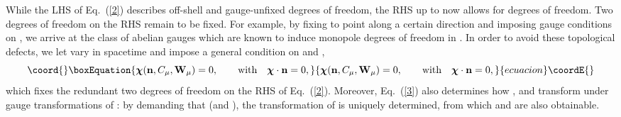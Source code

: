 \documentclass[a4paper,12pt]{article}
\providecommand{\re}[1]{~(\ref{#1})}\usepackage{useful_macros}
\begin{document}
While the LHS of Eq.\re{2} describes \coordHE{} off-shell and gauge-unfixed degrees of freedom,
the RHS up to now allows for \coordHE{} degrees of freedom. Two
degrees of freedom on the RHS remain to be fixed. For example, by
fixing \myHighlight{$\mn$}\coordHE{} to point along a certain direction and imposing gauge
conditions on \myHighlight{$\mW_\mu$}\coordHE{}, we arrive at the class of abelian gauges
which are known to induce monopole degrees of freedom in \coordHE{}. In
order to avoid these topological defects, we let \myHighlight{$\mn$}\coordHE{} vary in
spacetime and impose a general condition on \coordHE{} and \myHighlight{$\mW_\mu$}\coordHE{},
\begin{equation}\coord{}\boxEquation{
\mX(\mn,C_\mu,\mW_\mu)=0, \qquad\text{with}\quad
\mX\cdot\mn=0, \label{3}
}{
\mX(\mn,C_\mu,\mW_\mu)=0, \qquad\text{with}\quad
\mX\cdot\mn=0, }{ecuacion}\coordE{}\end{equation}
which fixes the redundant two degrees of freedom on the RHS of
Eq.\re{2}. Moreover, Eq.\re{3} also determines how \myHighlight{$\mn$}\coordHE{}, \coordHE{} and
\myHighlight{$\mW_\mu$}\coordHE{} transform under gauge transformations of \myHighlight{$\mA_\mu$}\coordHE{}: by 
demanding that \coordHE{} (and
\coordHE{}), the transformation \myHighlight{$\delta \mn$}\coordHE{} of \myHighlight{$\mn$}\coordHE{} is
uniquely determined, from which \coordHE{} and \myHighlight{$\delta\mW_\mu$}\coordHE{} are
also obtainable.
\end{document}

